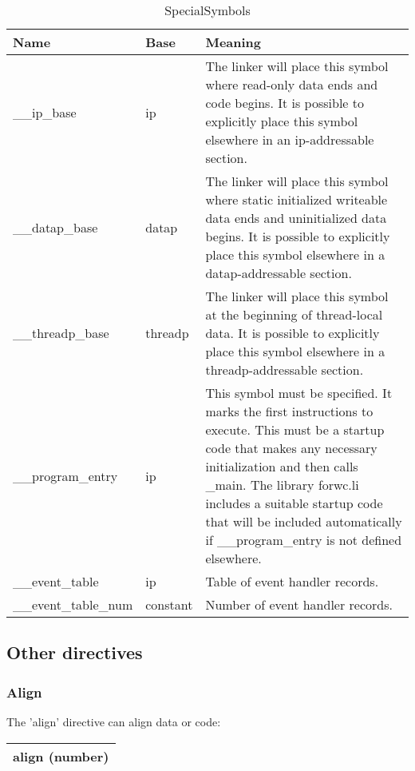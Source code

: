 \documentclass[forwardcom.tex]{subfiles}
\begin{document}
\begin{longtable} {|p{35mm}|p{16mm}|p{85mm}|}
\caption{SpecialSymbols} 
\label{table:specialSymbols}\\
\endfirsthead
\endhead
\hline
\bfseries Name & \bfseries Base & \bfseries Meaning  \\
\hline
\_\_ip\_base & ip & The linker will place this symbol where read-only data ends and code begins. 
It is possible to explicitly place this symbol elsewhere in an ip-addressable section.\\
\hline
\_\_datap\_base & datap & The linker will place this symbol where static initialized writeable data ends and uninitialized data begins. 
It is possible to explicitly place this symbol elsewhere in a datap-addressable section.\\
\hline
\_\_threadp\_base & threadp & The linker will place this symbol at the beginning of thread-local data. 
It is possible to explicitly place this symbol elsewhere in a threadp-addressable section.\\
\hline
\_\_program\_entry & ip & This symbol must be specified. It marks the first instructions to execute. 
This must be a startup code that makes any necessary initialization and then calls \_main.
The library forwc.li includes a suitable startup code that will be included automatically
if \_\_program\_entry is not defined elsewhere.\\
\hline
\_\_event\_table & ip & Table of event handler records.\\
\hline
\_\_event\_table\_num & constant & Number of event handler records.\\
\hline
\end{longtable}

\vv


\subsection{Other directives} \label{assemblyOtherDirectives}

\subsubsection{Align}
The 'align' directive can align data or code:
\vv

\begin{tabular}{|p{150mm}|}
\hline
\hspace{4mm} align (number)\\
\hline
\end{tabular}
\vv
\end{document}
